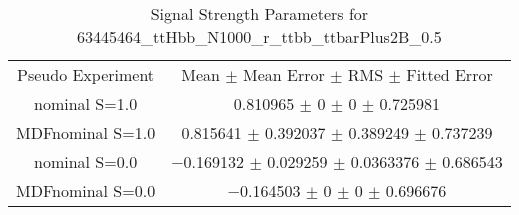 \begin{table}
\centering
\caption{Signal Strength Parameters for 63445464\_ttHbb\_N1000\_r\_ttbb\_ttbarPlus2B\_0.5}
\begin{tabular}{cc}
\toprule
Pseudo Experiment & Mean $\pm$ Mean Error $\pm$ RMS $\pm$ Fitted Error\\
nominal S=1.0 & \num{0.810965} $\pm$ \num{0} $\pm$ \num{0} $\pm$ \num{0.725981}\\
MDFnominal S=1.0 & \num{0.815641} $\pm$ \num{0.392037} $\pm$ \num{0.389249} $\pm$ \num{0.737239}\\
nominal S=0.0 & \num{-0.169132} $\pm$ \num{0.029259} $\pm$ \num{0.0363376} $\pm$ \num{0.686543}\\
MDFnominal S=0.0 & \num{-0.164503} $\pm$ \num{0} $\pm$ \num{0} $\pm$ \num{0.696676}\\
\bottomrule
\end{tabular}
\end{table}